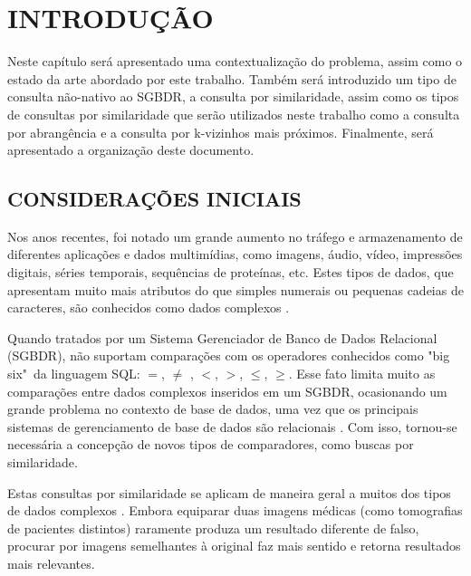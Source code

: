 

\chapter{INTRODUÇÃO}
\label{chap:introducao}

Neste capítulo será apresentado uma contextualização do problema, assim como o estado da arte abordado por este trabalho. %
Também será introduzido um tipo de consulta não-nativo ao SGBDR, a consulta por similaridade, assim como os tipos de consultas por similaridade
que serão utilizados neste trabalho como a consulta por abrangência e a consulta por k-vizinhos mais próximos. Finalmente, será apresentado a
organização deste documento.

\section{CONSIDERAÇÕES INICIAIS}
\label{sec:considini}

Nos anos recentes, foi notado um grande aumento no tráfego e armazenamento de diferentes aplicações e dados multimídias, como imagens, áudio, vídeo, impressões digitais, séries temporais,
sequências de proteínas, etc. Estes tipos de dados, que apresentam muito mais atributos do que simples numerais ou pequenas cadeias de caracteres, são conhecidos como dados complexos \cite{Zighed2008}.\par
Quando tratados por um Sistema Gerenciador de Banco de Dados Relacional (SGBDR), não suportam comparações com os operadores conhecidos como "big six"\ da linguagem SQL: $=$, $\neq$ , $<$, $>$, $\leq$, $\geq$.
Esse fato limita muito as comparações entre dados complexos inseridos em um SGBDR, ocasionando um grande problema no contexto de base de dados, uma vez que os principais sistemas de gerenciamento
de base de dados são relacionais \cite{DBE2017}. Com isso, tornou-se necessária a concepção de novos tipos de comparadores, como buscas por similaridade.\par 

Estas consultas por similaridade se aplicam de maneira geral a muitos dos tipos de dados complexos \cite{Barioni2009}. Embora equiparar duas imagens médicas (como tomografias de pacientes distintos) 
raramente produza um resultado diferente de falso, procurar por imagens semelhantes à original faz mais sentido e retorna resultados mais relevantes.

